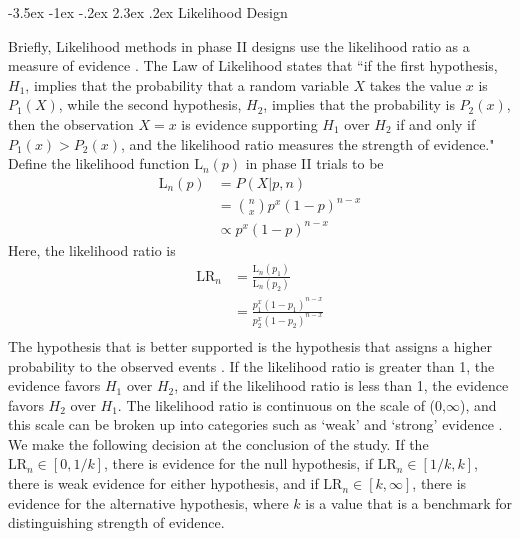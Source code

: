 \documentclass[12pt]{report}\usepackage[]{graphicx}\usepackage[]{color}
\makeatletter
\newlength{\li}\setlength{\li}{14.48pt}
\newlength{\di}\setlength{\di}{-3.5mm}
\renewcommand\section{ \@startsection {section}{1}{\z@}%
                                   {-3.5ex \@plus -1ex \@minus -.2ex}%
                                   {2.3ex \@plus.2ex}%
                                   {\centering\large\fontfamily{qcs}\selectfont}}
\makeatother
\begin{document}
\section{Likelihood Design}

Briefly, Likelihood methods in phase II designs use the likelihood ratio as a measure of evidence \cite{Ayers}. The Law of Likelihood states that ``if the first hypothesis, $H_1$, implies that the probability that a random variable $X$ takes the value $x$ is $P_1(X)$, while the second hypothesis, $H_2$, implies that the probability is $P_2(x)$, then the observation $X=x$ is evidence supporting $H_1$ over $H_2$ if and only if $P_1(x) > P_2(x)$, and the likelihood ratio measures the strength of evidence." \cite{Blume2002} Define the likelihood function $\mbox{L}_n(p)$ in phase II trials to be 
\begin{equation}
\begin{aligned}
\mbox{L}_n(p) &= P(X \vert p, n) \\
&= {n \choose x} p^x (1-p)^{n-x} \\
& \propto p^x (1-p)^{n-x}
\end{aligned}
\end{equation}
Here, the likelihood ratio is 
\begin{equation}
\begin{aligned}
\mbox{LR}_n & = \frac{\mbox{L}_n(p_1)}{\mbox{L}_n(p_2)} \\
&= \frac{p_1^{x}(1-p_1)^{n-x}}{p_2^{x}(1-p_2)^{n-x}} \\
\end{aligned}
\end{equation}
The hypothesis that is better supported is the hypothesis that assigns a higher probability to the observed events \cite{Blume2002}. If the likelihood ratio is greater than 1, the evidence favors $H_1$ over $H_2$, and if the likelihood ratio is less than 1, the evidence favors $H_2$ over $H_1$. The likelihood ratio is continuous on the scale of (0,$\infty$), and this scale can be broken up into categories such as `weak' and `strong' evidence \cite{Blume2002}. We make the following decision at the conclusion of the study. If the $\mbox{LR}_n \in [0, 1/k]$, there is evidence for the null hypothesis, if $\mbox{LR}_n \in [1/k,k]$, there is weak evidence for either hypothesis, and if $\mbox{LR}_n \in [k,\infty]$, there is evidence for the alternative hypothesis, where $k$ is a value that is a benchmark for distinguishing strength of evidence. \\
\end{document}
